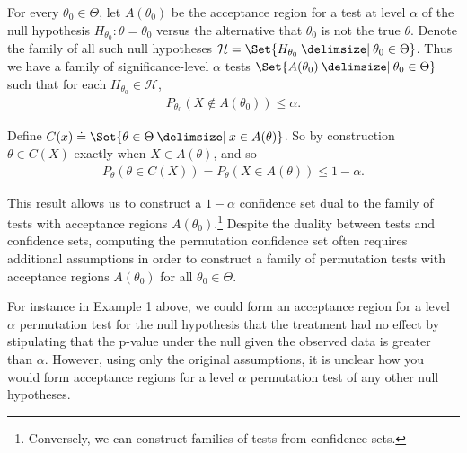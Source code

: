 For every $\theta_0 \in \Theta$, let $A(\theta_0)$ be the acceptance region for
a test at level $\alpha$ of the null hypothesis $H_{\theta_0}: \theta =
\theta_0$ versus the alternative that $\theta_0$ is not the true $\theta$.
Denote the family of all such null hypotheses $\mathcal{H} = \Set{H_{\theta_0}
\given \theta_0 \in \Theta}$.  Thus we have a family of significance-level
$\alpha$ tests $\Set{A(\theta_0) \given \theta_0 \in \Theta}$ such that for
each $H_{\theta_0} \in \mathcal{H}$,
\begin{align*}
P_{\theta_0}(X \notin A(\theta_0)) \le \alpha.
\end{align*}

Define $C(x) \doteq \Set{\theta \in \Theta \given x \in A(\theta)}$.
So by construction $\theta \in C(X)$ exactly when $X \in A(\theta)$, and so
\begin{align*}
P_{\theta}(\theta \in C(X)) = P_{\theta}(X \in A(\theta)) \le 1 - \alpha.
\end{align*}

This result allows us to construct a $1-\alpha$ confidence set dual to
the family of tests with acceptance regions $A(\theta_0)$.\footnote{Conversely,
we can construct families of tests from confidence sets.}  Despite the duality
between tests and confidence sets, computing the permutation confidence set
often requires additional assumptions in order to construct a family of
permutation tests with acceptance regions $A(\theta_0)$ for all $\theta_0 \in
\Theta$.

For instance in Example 1 above, we could form an acceptance region for a level
$\alpha$ permutation test for the null hypothesis that the treatment had no
effect by stipulating that the p-value under the null given the observed data
is greater than $\alpha$.  However, using only the original assumptions, it is
unclear how you would form acceptance regions for a level $\alpha$ permutation
test of any other null hypotheses. 

